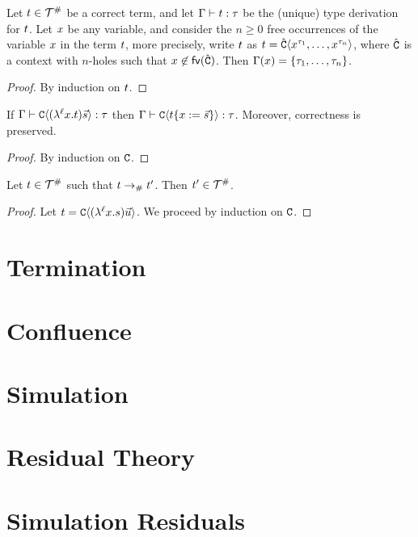 \begin{lemma}[Linearity]
Let $t \in \mathcal{T}^{\mathtt{\#}}$ be a correct term,
and let $\Gamma \vdash t : \tau$ be the (unique) type derivation for $t$.
Let $x$ be any variable,
and consider the $n \geq 0$ free occurrences of the variable $x$ in the term $t$,
more precisely, write $t$ as $t = \hat{\mathtt{C}}\langle x^{\tau_1},\hdots,x^{\tau_n}\rangle$,
where $\hat{\mathtt{C}}$ is a context with $n$-holes such that $x \not\in \mathsf{fv}({\hat{\mathtt{C}}})$.
Then $\Gamma(x) = \{\tau_1,\hdots,\tau_n\}$.
\end{lemma}
\begin{proof}
By induction on $t$.
\end{proof}



\begin{lemma}
If $\Gamma \vdash \mathtt{C}\langle(\lambda^{\ell} x. t) \vec{s}\rangle : \tau$
then $\Gamma \vdash \mathtt{C}\langle t\{x := \vec{s}\}\rangle : \tau$.
Moreover, correctness is preserved.
\end{lemma}
\begin{proof}
 By induction on $\mathtt{C}$.
\end{proof}

\begin{lemma}
Let $t \in \mathcal{T}^{\mathtt{\#}}$ such that $t \mathrel{\to_{\mathtt{\#}}} t'$. Then $t' \in \mathcal{T}^{\mathtt{\#}}$.
\end{lemma}
\begin{proof}
Let $t = \mathtt{C}\langle(\lambda^{\ell} x. s) \vec{u}\rangle$. We proceed by induction on $\mathtt{C}$.
\end{proof}


\section{Termination}

\section{Confluence}

\section{Simulation}

\section{Residual Theory}

\section{Simulation Residuals}

